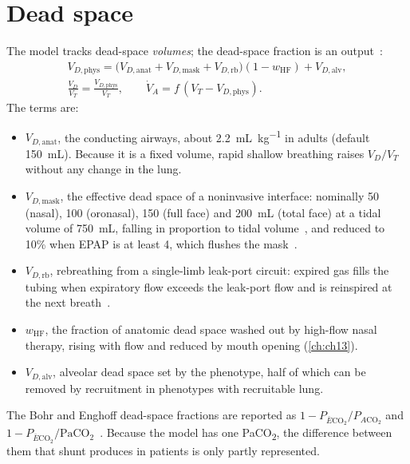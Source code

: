 \section{Dead space}
\label{sec:co2-vd}
The model tracks dead-space \emph{volumes}; the dead-space fraction is an output~\citep{fletcher1981}:
\begin{equation}
\begin{gathered}
V_{D,\mathrm{phys}} = \bigl(V_{D,\mathrm{anat}} + V_{D,\mathrm{mask}} + V_{D,\mathrm{rb}}\bigr)(1 - w_{\mathrm{HF}}) + V_{D,\mathrm{alv}},\\
\frac{V_D}{V_T} = \frac{V_{D,\mathrm{phys}}}{V_T},\qquad
\dot V_A = f\,(V_T - V_{D,\mathrm{phys}}).
\end{gathered}
\label{eq:co2-vd}
\end{equation}
The terms are:
\begin{itemize}[leftmargin=*]
\item $V_{D,\mathrm{anat}}$, the conducting airways, about \SI{2.2}{\milli\liter\per\kilogram} in adults (default \SI{150}{\milli\liter}). Because it is a fixed volume, rapid shallow breathing raises $V_D/V_T$ without any change in the lung.
\item $V_{D,\mathrm{mask}}$, the effective dead space of a noninvasive interface: nominally 50 (nasal), 100 (oronasal), 150 (full face) and \SI{200}{\milli\liter} (total face) at a tidal volume of \SI{750}{\milli\liter}, falling in proportion to tidal volume~\citep{fodil2011}, and reduced to 10\% when EPAP is at least \SI{4}{\cmH}, which flushes the mask~\citep{saatci2004}.
\item $V_{D,\mathrm{rb}}$, rebreathing from a single-limb leak-port circuit: expired gas fills the tubing when expiratory flow exceeds the leak-port flow and is reinspired at the next breath~\citep{ferguson1995}.
\item $w_{\mathrm{HF}}$, the fraction of anatomic dead space washed out by high-flow nasal therapy, rising with flow and reduced by mouth opening (\cref{ch:ch13}).
\item $V_{D,\mathrm{alv}}$, alveolar dead space set by the phenotype, half of which can be removed by recruitment in phenotypes with recruitable lung.
\end{itemize}
The Bohr and Enghoff dead-space fractions are reported as $1 - P_{\bar E\mathrm{CO_2}}/P_{A\mathrm{CO_2}}$ and $1 - P_{\bar E\mathrm{CO_2}}/\mathrm{PaCO_2}$~\citep{bohr1891,enghoff1938}. Because the model has one PaCO\textsubscript{2}, the difference between them that shunt produces in patients is only partly represented.

